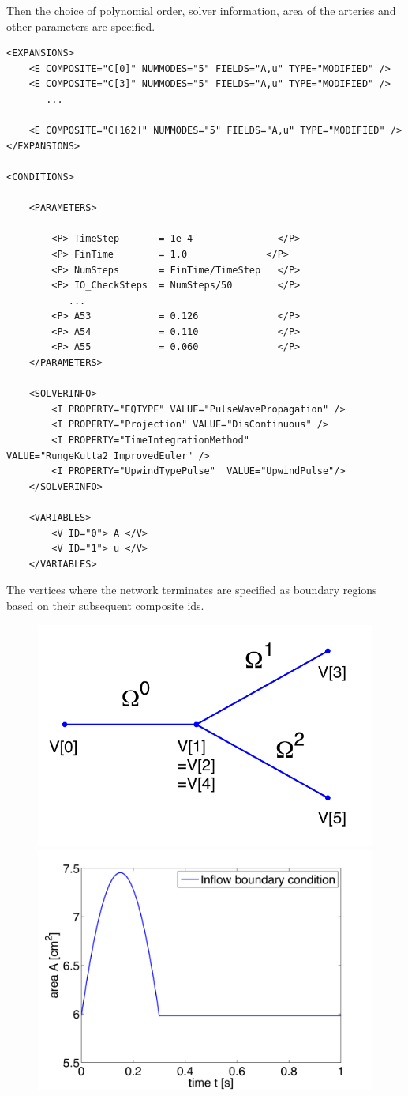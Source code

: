 Then the choice of polynomial order, solver information, area of the arteries
and other parameters are specified.

\begin{lstlisting}[style=XmlStyle]
<EXPANSIONS>
    <E COMPOSITE="C[0]" NUMMODES="5" FIELDS="A,u" TYPE="MODIFIED" />
    <E COMPOSITE="C[3]" NUMMODES="5" FIELDS="A,u" TYPE="MODIFIED" />
       ...

    <E COMPOSITE="C[162]" NUMMODES="5" FIELDS="A,u" TYPE="MODIFIED" />
</EXPANSIONS>

<CONDITIONS>

    <PARAMETERS>

        <P> TimeStep       = 1e-4               </P> 
        <P> FinTime        = 1.0              </P>
        <P> NumSteps       = FinTime/TimeStep   </P>
        <P> IO_CheckSteps  = NumSteps/50        </P>
           ...
        <P> A53            = 0.126              </P>
        <P> A54            = 0.110              </P>
        <P> A55            = 0.060              </P>
    </PARAMETERS>

    <SOLVERINFO>
        <I PROPERTY="EQTYPE" VALUE="PulseWavePropagation" />
        <I PROPERTY="Projection" VALUE="DisContinuous" />
        <I PROPERTY="TimeIntegrationMethod" VALUE="RungeKutta2_ImprovedEuler" />
        <I PROPERTY="UpwindTypePulse"  VALUE="UpwindPulse"/> 
    </SOLVERINFO>

    <VARIABLES>
        <V ID="0"> A </V>
        <V ID="1"> u </V>
    </VARIABLES>

\end{lstlisting}

The vertices where the network terminates are specified as boundary regions
based on their subsequent composite ids.

\begin{figure}
	\includegraphics[width=0.49\linewidth]{img/Bifurcation.png}
	\includegraphics[width=0.49\linewidth]{img/Network_Inflow.png}
\end{figure}

